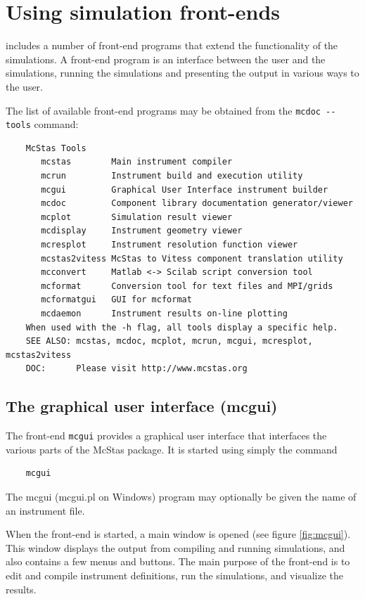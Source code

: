 \section{Using simulation front-ends}
\label{s:frontends}

\MCS includes a number of front-end programs that extend the
functionality of the simulations. A front-end program is an interface
between the user and the simulations, running the simulations and
presenting the output in various ways to the user.

The list of available \MCS front-end programs may be obtained from the \verb+mcdoc --tools+ command:
\begin{lstlisting}
    McStas Tools
       mcstas        Main instrument compiler
       mcrun         Instrument build and execution utility
       mcgui         Graphical User Interface instrument builder
       mcdoc         Component library documentation generator/viewer
       mcplot        Simulation result viewer
       mcdisplay     Instrument geometry viewer
       mcresplot     Instrument resolution function viewer
       mcstas2vitess McStas to Vitess component translation utility
       mcconvert     Matlab <-> Scilab script conversion tool
       mcformat      Conversion tool for text files and MPI/grids
       mcformatgui   GUI for mcformat
       mcdaemon      Instrument results on-line plotting
    When used with the -h flag, all tools display a specific help.
    SEE ALSO: mcstas, mcdoc, mcplot, mcrun, mcgui, mcresplot, mcstas2vitess
    DOC:      Please visit http://www.mcstas.org
\end{lstlisting}

\subsection{The graphical user interface (mcgui)}
\label{s:mcgui}

The front-end \verb+mcgui+ provides a graphical user interface that
interfaces the various parts of the McStas package. It is started using
simply the command
\begin{lstlisting}
    mcgui
\end{lstlisting}
The mcgui (mcgui.pl on Windows) program may optionally be given the name of an instrument file.

When the front-end is started, a main window is opened (see figure \ref{fig:mcgui}). This window
displays the output from compiling and running simulations, and also
contains a few menus and buttons. The main purpose of the front-end is
to edit and compile instrument definitions, run the simulations, and
visualize the results.

